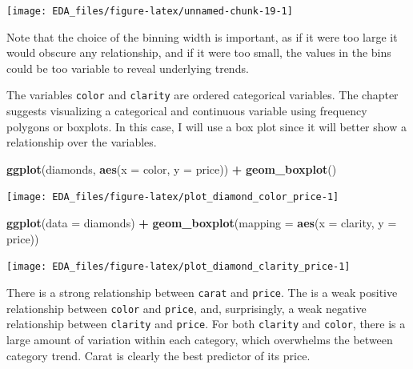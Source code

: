 \documentclass[]{book}
\newenvironment{Shaded}{\begin{snugshade}}{\end{snugshade}}
\newcommand{\DataTypeTok}[1]{\textcolor[rgb]{0.13,0.29,0.53}{#1}}
\newcommand{\KeywordTok}[1]{\textcolor[rgb]{0.13,0.29,0.53}{\textbf{#1}}}
\newcommand{\NormalTok}[1]{#1}
\newcommand{\OperatorTok}[1]{\textcolor[rgb]{0.81,0.36,0.00}{\textbf{#1}}}
\newcommand{\StringTok}[1]{\textcolor[rgb]{0.31,0.60,0.02}{#1}}
\theoremstyle{plain}
\theoremstyle{remark}
\begin{document}
\begin{center}\texttt{[image: EDA\_files/figure-latex/unnamed-chunk-19-1]} \end{center}

Note that the choice of the binning width is important, as if it were too large it would obscure any relationship, and if it were too small, the values in the bins could be too variable to reveal underlying trends.

The variables \texttt{color} and \texttt{clarity} are ordered categorical variables.
The chapter suggests visualizing a categorical and continuous variable using frequency polygons or boxplots.
In this case, I will use a box plot since it will better show a relationship over the variables.

\begin{Shaded}
\begin{Highlighting}[]
\KeywordTok{ggplot}\NormalTok{(diamonds, }\KeywordTok{aes}\NormalTok{(}\DataTypeTok{x =}\NormalTok{ color, }\DataTypeTok{y =}\NormalTok{ price)) }\OperatorTok{+}
\StringTok{  }\KeywordTok{geom_boxplot}\NormalTok{()}
\end{Highlighting}
\end{Shaded}

\begin{center}\texttt{[image: EDA\_files/figure-latex/plot\_diamond\_color\_price-1]} \end{center}

\begin{Shaded}
\begin{Highlighting}[]
\KeywordTok{ggplot}\NormalTok{(}\DataTypeTok{data =}\NormalTok{ diamonds) }\OperatorTok{+}
\StringTok{  }\KeywordTok{geom_boxplot}\NormalTok{(}\DataTypeTok{mapping =} \KeywordTok{aes}\NormalTok{(}\DataTypeTok{x =}\NormalTok{ clarity, }\DataTypeTok{y =}\NormalTok{ price))}
\end{Highlighting}
\end{Shaded}

\begin{center}\texttt{[image: EDA\_files/figure-latex/plot\_diamond\_clarity\_price-1]} \end{center}

There is a strong relationship between \texttt{carat} and \texttt{price}.
The is a weak positive relationship between \texttt{color} and \texttt{price},
and, surprisingly, a weak negative relationship between \texttt{clarity} and \texttt{price}.
For both \texttt{clarity} and \texttt{color}, there is a large amount of variation within each category, which overwhelms the between category trend.
Carat is clearly the best predictor of its price.
\end{document}

